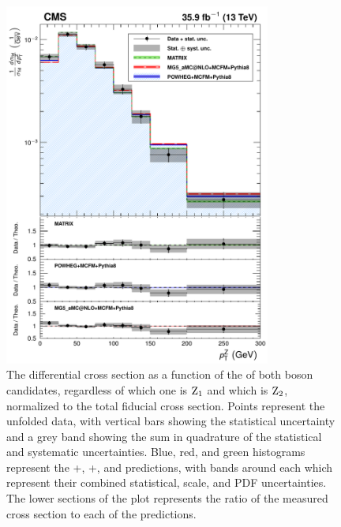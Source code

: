 \begin{figure}[htbp]
  \begin{center}
    \includegraphics[width=0.78\textwidth]{results/unfold_zPt.pdf}
    \caption[Normalized differential {\ZZ} cross section as a function of {\PZ} boson candidate {\pt}]{
        The {\ZZ} differential cross section as a function of the {\pt} of both {\PZ} boson candidates, regardless of which one is $\mathrm{Z}_1$ and which is $\mathrm{Z}_2$, normalized to the total fiducial cross section.
        Points represent the unfolded data, with vertical bars showing the statistical uncertainty and a grey band showing the sum in quadrature of the statistical and systematic uncertainties.
        Blue, red, and green histograms represent the {\POWHEG}+{\MCFM}, {\MGAMC}+{\MCFM}, and {\MATRIX} predictions, with bands around each which represent their combined statistical, scale, and PDF uncertainties.
        The lower sections of the plot represents the ratio of the measured cross section to each of the predictions.
      }\label{fig:unfold_zPt}
  \end{center}
\end{figure}

